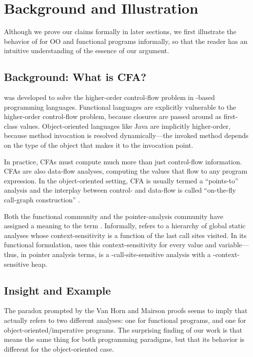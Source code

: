 \section{Background and Illustration}

Although we prove our claims formally in later sections, we first
illustrate the behavior of \kCFA{} for OO and functional
programs informally, so that the reader has an intuitive understanding of the
essence of our argument.

\subsection{Background: What is CFA?}
\kCFA{} was developed to solve the higher-order control-flow problem
in \lc-based programming languages.
Functional languages are explicitly vulnerable to the higher-order
control-flow problem, because closures are passed around as
first-class values.
Object-oriented languages like Java are implicitly higher-order,
because method invocation is resolved dynamically---the invoked method
depends on the type of the object that makes it to the invocation
point.


In practice, CFAs must compute much more than just control-flow
information.  CFAs are also data-flow analyses, computing the values
that flow to any program expression. In the object-oriented setting,
CFA is usually termed a ``points-to'' analysis and the interplay
between control- and data-flow is called ``on-the-fly call-graph
construction'' \cite{Lhotak:2006:PAU}.

Both the functional community and the pointer-analysis community have
assigned a meaning to the term \kCFA.
Informally, \kCFA{} refers to a hierarchy of global static analyses
whose context-sensitivity is a function of the last  call sites 
visited.
In its functional formulation, \kCFA{} uses this context-sensitivity
for every value and variable---thus, in pointer analysis terms,
\kCFA{} is a -call-site-sensitive analysis with a -context-sensitive
heap.


\subsection{Insight and Example}

The paradox prompted by the Van Horn and Mairson proofs seems to imply
that \kCFA{} actually refers to two different analyses: one for
functional programs, and one for object-oriented/imperative programs.
The surprising finding of our work is that \kCFA{} means the same
thing for both programming paradigms, but that its behavior is different
for the object-oriented case.

